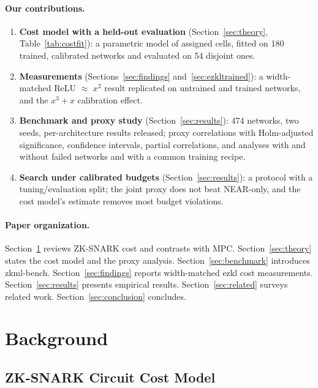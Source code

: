 \documentclass[10pt]{article}
\begin{document}
\paragraph{Our contributions.}
\begin{enumerate}
\item \textbf{Cost model with a held-out evaluation} (Section~\ref{sec:theory}, Table~\ref{tab:costfit}): a parametric model of assigned cells, fitted on 180 trained, calibrated networks and evaluated on 54 disjoint ones.
\item \textbf{Measurements} (Sections~\ref{sec:findings} and~\ref{sec:ezkltrained}): a width-matched ReLU $\approx$ $x^2$ result replicated on untrained and trained networks, and the $x^3{+}x$ calibration effect.
\item \textbf{Benchmark and proxy study} (Section~\ref{sec:results}): 474 networks, two seeds, per-architecture results released; proxy correlations with Holm-adjusted significance, confidence intervals,
  partial correlations, and analyses with and without failed networks and with a common training recipe.
\item \textbf{Search under calibrated budgets} (Section~\ref{sec:results}): a protocol with a tuning/evaluation split; the joint proxy does not beat NEAR-only, and the cost model's estimate removes most budget violations.
\end{enumerate}

\paragraph{Paper organization.}
Section~\ref{sec:background} reviews ZK-SNARK cost and contrasts with MPC.
Section~\ref{sec:theory} states the cost model and the proxy analysis.
Section~\ref{sec:benchmark} introduces zkml-bench.
Section~\ref{sec:findings} reports width-matched ezkl cost measurements.
Section~\ref{sec:results} presents empirical results.
Section~\ref{sec:related} surveys related work.
Section~\ref{sec:conclusion} concludes.


\section{Background}
\label{sec:background}

\subsection{ZK-SNARK Circuit Cost Model}
\end{document}
